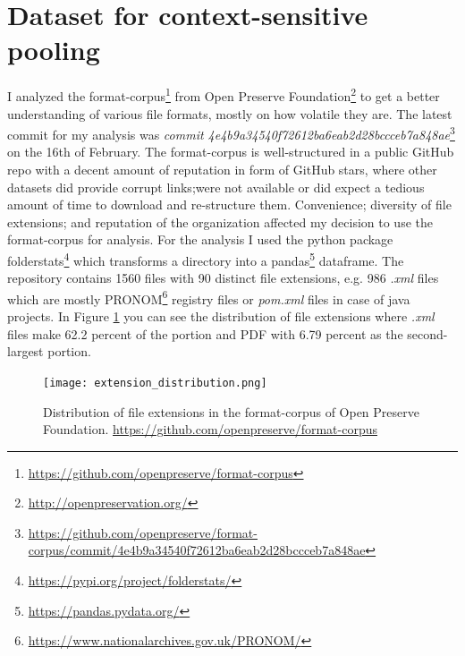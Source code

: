 \section{Dataset for context-sensitive pooling}\label{sec:dataset}
I analyzed the format-corpus\footnote{\url{https://github.com/openpreserve/format-corpus}} from Open Preserve Foundation\footnote{\url{ http://openpreservation.org/}} to get a better understanding of various file formats, mostly on how volatile they are. The latest commit for my analysis was \textit{commit 4e4b9a34540f72612ba6eab2d28bccceb7a848ae}\footnote{\url{https://github.com/openpreserve/format-corpus/commit/4e4b9a34540f72612ba6eab2d28bccceb7a848ae}} on the 16th of February. The format-corpus is well-structured in a public GitHub repo with a decent amount of reputation in form of GitHub stars, where other datasets did provide corrupt links;were not available or did expect a tedious amount of time to download and re-structure them. Convenience; diversity of file extensions; and reputation of the organization affected my decision to use the format-corpus for analysis.
For the analysis I used the python package folderstats\footnote{\url{https://pypi.org/project/folderstats/}} which transforms a directory into a pandas\footnote{\url{https://pandas.pydata.org/}} dataframe. The repository contains 1560 files with 90 distinct file extensions, e.g. 986 \textit{.xml} files which are mostly PRONOM\footnote{\url{https://www.nationalarchives.gov.uk/PRONOM/}} registry files or \textit{pom.xml} files in case of java projects. In Figure \ref{fig:extension_distribution} you can see the distribution of file extensions where \textit{.xml} files make 62.2 percent of the portion and PDF with 6.79 percent as the second-largest portion.
\begin{figure}[h]
    \caption{Distribution of file extensions in the format-corpus of Open Preserve Foundation. \url{https://github.com/openpreserve/format-corpus}}
    \label{fig:extension_distribution}
    \centering
    \texttt{[image: extension\_distribution.png]}
\end{figure}

